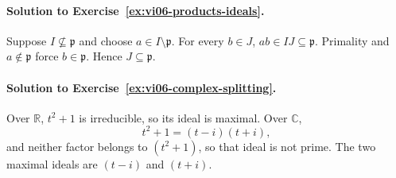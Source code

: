 \paragraph{Solution to Exercise~\ref{ex:vi06-products-ideals}.}
Suppose \(I\not\subseteq\mathfrak p\) and choose \(a\in I\setminus\mathfrak p\).  For every
\(b\in J\), \(ab\in IJ\subseteq\mathfrak p\).  Primality and \(a\notin\mathfrak p\)
force \(b\in\mathfrak p\).  Hence \(J\subseteq\mathfrak p\).

\paragraph{Solution to Exercise~\ref{ex:vi06-complex-splitting}.}
Over \(\mathbb R\), \(t^2+1\) is irreducible, so its ideal is maximal.  Over \(\mathbb C\),
\[
t^2+1=(t-i)(t+i),
\]
and neither factor belongs to \((t^2+1)\), so that ideal is not prime.  The two maximal
ideals are \((t-i)\) and \((t+i)\).
